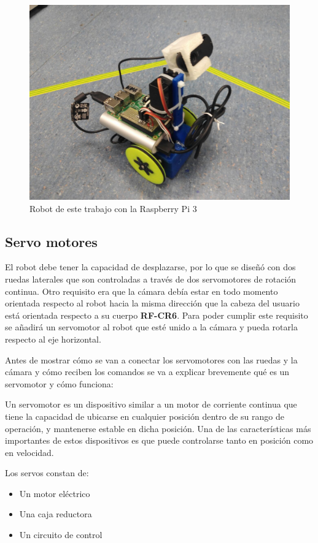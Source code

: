 \documentclass[twoside, 11pt]{epstfg}
\begin{document}
\begin{figure}[H]
	\centerline{
		\mbox{\includegraphics[width=.80\textwidth]{images/fotorobotlateral.jpg}}
	}
	\caption{Robot de este trabajo con la Raspberry Pi 3}
	\label{robotraspi}
	
\end{figure}

\subsection{Servo motores}
El robot debe tener la capacidad de desplazarse, por lo que se diseñó con dos ruedas laterales que son controladas a través de dos servomotores de rotación continua. Otro requisito era que la cámara debía estar en todo momento orientada respecto al robot hacia la misma dirección que la cabeza del usuario está orientada respecto a su cuerpo \textbf{RF-CR6}. Para poder cumplir este requisito se añadirá un servomotor al robot que esté unido a la cámara y pueda rotarla respecto al eje horizontal.

Antes de mostrar cómo se van a conectar los servomotores con las ruedas y la cámara y cómo reciben los comandos se va a explicar brevemente qué es un servomotor y cómo funciona:

Un servomotor es un dispositivo similar a un motor de corriente continua que tiene la capacidad de ubicarse en cualquier posición dentro de su rango de operación, y mantenerse estable en dicha posición. Una de las características más importantes de estos dispositivos es que puede controlarse tanto en posición como en velocidad.


Los servos constan de:
\begin{itemize}
	\item Un motor eléctrico
	\item Una caja reductora
	\item Un circuito de control
\end{itemize}
\end{document}
